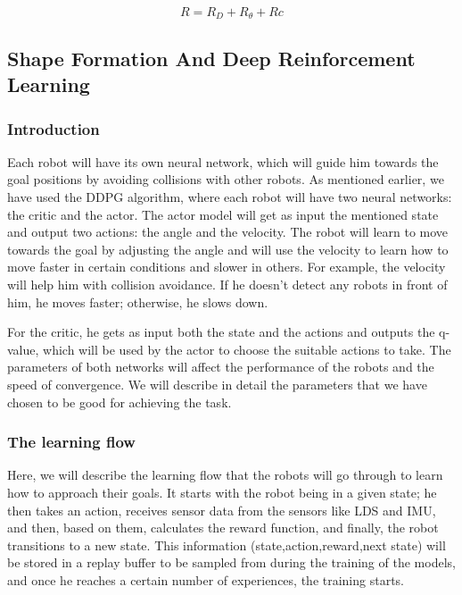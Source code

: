 \documentclass[12pt]{extarticle}
\begin{document}
 
    \begin{equation} \label{final_r}
     R=R_{D}+R_{\theta}+R{c}
   \end{equation}






\subsection{Shape Formation And Deep Reinforcement Learning}
\subsubsection{Introduction}




Each robot will have its own neural network, which will guide him towards the goal positions by avoiding collisions with other robots.
As mentioned earlier, we have used the DDPG algorithm, where each robot will have two neural networks: the critic and the actor.
The actor model will get as input the mentioned state and output two actions: the angle and the velocity.
The robot will learn to move towards the goal by adjusting the angle and will use the velocity to learn how to move faster in certain conditions and slower in others. For example, the velocity will help him with collision avoidance. If he doesn't detect any robots in front of him, he moves faster; otherwise, he slows down.

For the critic, he gets as input both the state and the actions and outputs the q-value, which will be used by the actor to choose the suitable actions to take.
The parameters of both networks will affect the performance of the robots and the speed of convergence. We will describe in detail the parameters that we have chosen to be good for achieving the task.

\subsubsection{The learning flow}
Here, we will describe the learning flow that the robots will go through to learn how to approach their goals.
It starts with the robot being in a given state; he then takes an action, receives sensor data from the sensors like LDS and IMU, and then, based on them, calculates the reward function, and finally, the robot transitions to a new state.
This information (state,action,reward,next state) will be stored in a replay buffer to be sampled from during the training of the models, and once he reaches a certain number of experiences, the training starts.
\end{document}

